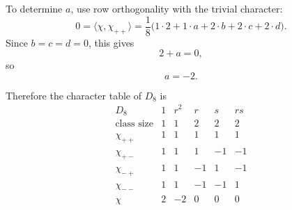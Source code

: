 \begin{example}
    To determine \(a\), use row orthogonality with the trivial character:
    \[
        0
        =
        \langle \chi,\chi_{++}\rangle
        =
        \frac{1}{8}
        \bigl(
            1\cdot 2
            +
            1\cdot a
            +
            2\cdot b
            +
            2\cdot c
            +
            2\cdot d
        \bigr).
    \]
    Since \(b=c=d=0\), this gives
    \[
        2+a=0,
    \]
    so
    \[
        a=-2.
    \]

    Therefore the character table of \(D_8\) is
    \[
        \begin{array}{c|ccccc}
            D_8 & 1 & r^2 & r & s & rs\\
            \hline
            \text{class size} & 1 & 1 & 2 & 2 & 2\\
            \hline
            \chi_{++} & 1 & 1 & 1 & 1 & 1\\
            \chi_{+-} & 1 & 1 & 1 & -1 & -1\\
            \chi_{-+} & 1 & 1 & -1 & 1 & -1\\
            \chi_{--} & 1 & 1 & -1 & -1 & 1\\
            \chi & 2 & -2 & 0 & 0 & 0
        \end{array}
    \]
\end{example}

